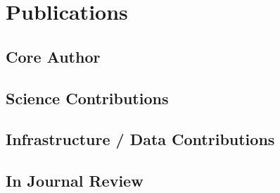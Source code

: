 

\section{Publications}


\subsection{Core Author}

\newrefcontext[sorting=ydnt]
\begin{refsection}
    \nocite{*}
    \printbibliography[heading=none, keyword={primary}]
\end{refsection}


\subsection{Science Contributions}
\begin{refsection}
	\nocite{*}
	\printbibliography[heading=none, keyword={science}]
\end{refsection}


\subsection{Infrastructure / Data Contributions}
\begin{refsection}
	\nocite{*}
	\printbibliography[heading=none, keyword={infrastructure}]
\end{refsection}


\subsection{In Journal Review}
\begin{refsection}
	\nocite{*}
	\printbibliography[heading=none, keyword={draft}]
\end{refsection}

